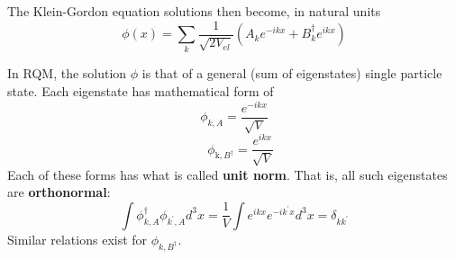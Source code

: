 The Klein-Gordon equation solutions then become, in natural units
\begin{equation}
\phi(x)=\sum_{k} \frac{1}{\sqrt{2 V_{e l}}}\left(A_{k} e^{-i k x}+B_{k}^{\dagger} e^{i k x}\right)
\end{equation}
\begin{mybox}
In RQM, the solution $\phi$ is that of a general (sum of eigenstates) single particle state. Each eigenstate has mathematical form of
$$
\phi_{k, A}=\frac{e^{-i k x}}{\sqrt{V}}
$$
$$
\quad \phi_{\mathrm{k}, B^{\dagger}}=\frac{e^{i k x}}{\sqrt{V}}
$$
Each of these forms has what is called \textbf{unit norm}. That is, all such eigenstates are \textbf{orthonormal}:
\begin{equation}
\int \phi_{k, A}^{\dagger} \phi_{k^{\prime},A} d^{3} x=\frac{1}{V} \int e^{i k x} e^{-i k^{\prime} x} d^{3} x=\delta_{k k^{\prime}}
\label{orthonormal-integral}
\end{equation}
Similar relations exist for $\phi_{k, B^{\dagger}}$.
\end{mybox}

